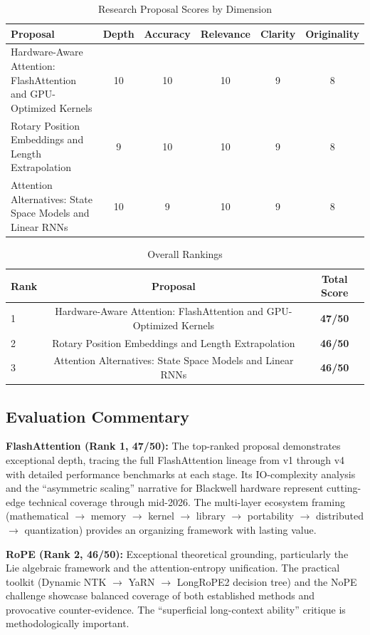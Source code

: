 \documentclass[11pt,a4paper]{article}
\begin{document}
\begin{table}[H]
\centering
\caption{Research Proposal Scores by Dimension}
\begin{tabular}{@{}lccccc@{}}
\toprule
\textbf{Proposal} & \textbf{Depth} & \textbf{Accuracy} & \textbf{Relevance} & \textbf{Clarity} & \textbf{Originality} \\
\midrule
Hardware-Aware Attention: FlashAttention and GPU-Optimized Kernels
    & 10 & 10 & 10 & 9  & 8  \\[4pt]
Rotary Position Embeddings and Length Extrapolation
    & 9  & 10 & 10 & 9  & 8  \\[4pt]
Attention Alternatives: State Space Models and Linear RNNs
    & 10 & 9  & 10 & 9  & 8  \\
\bottomrule
\end{tabular}
\end{table}

\begin{table}[H]
\centering
\caption{Overall Rankings}
\begin{tabular}{@{}lcc@{}}
\toprule
\textbf{Rank} & \textbf{Proposal} & \textbf{Total Score} \\
\midrule
1 & Hardware-Aware Attention: FlashAttention and GPU-Optimized Kernels & \textbf{47/50} \\
2 & Rotary Position Embeddings and Length Extrapolation & \textbf{46/50} \\
3 & Attention Alternatives: State Space Models and Linear RNNs & \textbf{46/50} \\
\bottomrule
\end{tabular}
\end{table}

\subsection{Evaluation Commentary}

\textbf{FlashAttention (Rank 1, 47/50):} The top-ranked proposal demonstrates exceptional depth, tracing the full FlashAttention lineage from v1 through v4 with detailed performance benchmarks at each stage. Its IO-complexity analysis and the ``asymmetric scaling'' narrative for Blackwell hardware represent cutting-edge technical coverage through mid-2026. The multi-layer ecosystem framing (mathematical $\to$ memory $\to$ kernel $\to$ library $\to$ portability $\to$ distributed $\to$ quantization) provides an organizing framework with lasting value.

\textbf{RoPE (Rank 2, 46/50):} Exceptional theoretical grounding, particularly the Lie algebraic framework and the attention-entropy unification. The practical toolkit (Dynamic NTK $\to$ YaRN $\to$ LongRoPE2 decision tree) and the NoPE challenge showcase balanced coverage of both established methods and provocative counter-evidence. The ``superficial long-context ability'' critique is methodologically important.
\end{document}
